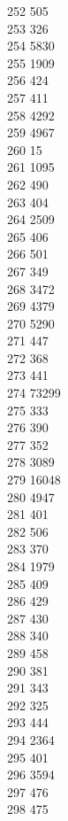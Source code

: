 { 252	505 \\
 253	326 \\
 254	5830 \\
 255	1909 \\
 256	424 \\
 257	411 \\
 258	4292 \\
 259	4967 \\
 260	15 \\
 261	1095 \\
 262	490 \\
 263	404 \\
 264	2509 \\
 265	406 \\
 266	501 \\
 267	349 \\
 268	3472 \\
 269	4379 \\
 270	5290 \\
 271	447 \\
 272	368 \\
 273	441 \\
 274	73299 \\
 275	333 \\
 276	390 \\
 277	352 \\
 278	3089 \\
 279	16048 \\
 280	4947 \\
 281	401 \\
 282	506 \\
 283	370 \\
 284	1979 \\
 285	409 \\
 286	429 \\
 287	430 \\
 288	340 \\
 289	458 \\
 290	381 \\
 291	343 \\
 292	325 \\
 293	444 \\
 294	2364 \\
 295	401 \\
 296	3594 \\
 297	476 \\
 298	475 \\
}
